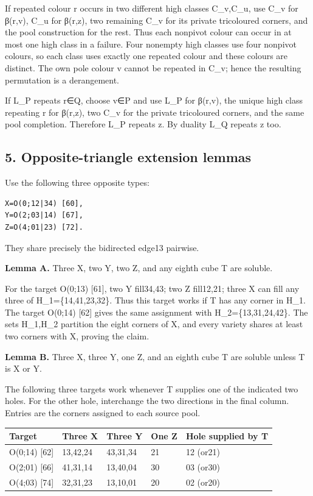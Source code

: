 \documentclass[
  10pt,
]{article}
\begin{document}
If repeated colour r occurs in two different high classes C\_v,C\_u, use
C\_v for β(r,v), C\_u for β(r,z), two remaining C\_v for its private
tricoloured corners, and the pool construction for the rest. Thus each
nonpivot colour can occur in at most one high class in a failure. Four
nonempty high classes use four nonpivot colours, so each class uses
exactly one repeated colour and these colours are distinct. The own pole
colour v cannot be repeated in C\_v; hence the resulting permutation is
a derangement.

If L\_P repeats r∈Q, choose v∈P and use L\_P for β(r,v), the unique high
class repeating r for β(r,z), two C\_v for the private tricoloured
corners, and the same pool completion. Therefore L\_P repeats z. By
duality L\_Q repeats z too.

\hypertarget{opposite-triangle-extension-lemmas}{%
\subsection*{5. Opposite-triangle extension
lemmas}\label{opposite-triangle-extension-lemmas}}

Use the following three opposite types:

\begin{verbatim}
X=O(0;12|34) [60],
Y=O(2;03|14) [67],
Z=O(4;01|23) [72].
\end{verbatim}

They share precisely the bidirected edge13 pairwise.

\textbf{Lemma A.} Three X, two Y, two Z, and any eighth cube T are
soluble.

For the target O(0;13) {[}61{]}, two Y fill34,43; two Z
fill12,21; three X can fill any three of H\_1=\{14,41,23,32\}. Thus this
target works if T has any corner in H\_1. The target O(0;14)
{[}62{]} gives the same assignment with H\_2=\{13,31,24,42\}. The sets
H\_1,H\_2 partition the eight corners of X, and every variety shares at
least two corners with X, proving the claim.

\textbf{Lemma B.} Three X, three Y, one Z, and an eighth cube T are
soluble unless T is X or Y.

The following three targets work whenever T supplies one of the
indicated two holes. For the other hole, interchange the two directions
in the final column. Entries are the corners assigned to each source
pool.

\begin{longtable}[]{@{}lllll@{}}
\toprule\noalign{}
Target & Three X & Three Y & One Z & Hole supplied by T \\
\midrule\noalign{}
\endhead
\bottomrule\noalign{}
\endlastfoot
O(0;14\textbar23) {[}62{]} & 13,42,24 & 43,31,34 & 21 & 12 (or21) \\
O(2;01\textbar34) {[}66{]} & 41,31,14 & 13,40,04 & 30 & 03 (or30) \\
O(4;03\textbar12) {[}74{]} & 32,31,23 & 13,10,01 & 20 & 02 (or20) \\
\end{longtable}
\end{document}
